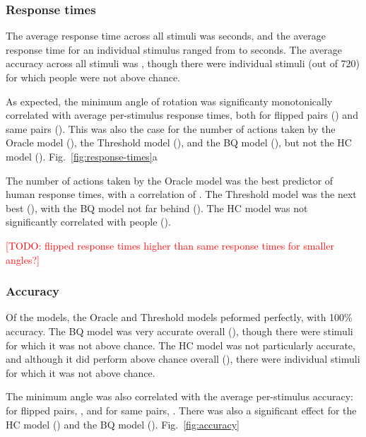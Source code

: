 \documentclass[10pt,letterpaper]{article}
\newcommand{\TODO}[1]{\textcolor{red}{[TODO: #1]}}
\newcommand{\Oc}[0]{Oracle}
\newcommand{\Th}[0]{Threshold}
\newcommand{\Hc}[0]{HC}
\newcommand{\Bq}[0]{BQ}
\begin{document}
\subsubsection{Response times}

The average response time across all stimuli was \ExpTime{} seconds,
and the average response time for an individual stimulus ranged from
\ExpTimeMin{} to \ExpTimeMax{} seconds. The average accuracy across
all stimuli was \ExpAccuracy{}, though there were \ExpNumChance{}
individual stimuli (out of 720) for which people were not above
chance.

As expected, the minimum angle of rotation was significanty
monotonically correlated with average per-stimulus response times,
both for flipped pairs (\ExpThetaTimeCorrFlipped{}) and same pairs
(\ExpThetaTimeCorrSame{}). This was also the case for the number of
actions taken by the \Oc{} model (\OcThetaTimeCorr{}), the \Th{}
model (\ThThetaTimeCorr{}), and the \Bq{} model
(\BqThetaTimeCorr{}), but not the \Hc{} model
(\HcThetaTimeCorr{}). Fig.~\ref{fig:response-times}a

The number of actions taken by the \Oc{} model was the best predictor
of human response times, with a correlation of \ExpOcTimeCorr{}. The
\Th{} model was the next best (\ExpThTimeCorr{}), with the \Bq{} model
not far behind (\ExpBqTimeCorr{}). The \Hc{} model was not
significantly correlated with people (\ExpHcTimeCorr{}).

\TODO{flipped response times higher than same response times for
  smaller angles?}

\subsubsection{Accuracy}

Of the models, the \Oc{} and \Th{} models peformed perfectly,
with 100\% accuracy. The \Bq{} model was very accurate
overall (\BqAccuracy{}), though there were \BqNumChance{} stimuli for
which it was not above chance. The \Hc{} model was not
particularly accurate, and although it did perform above chance
overall (\HcAccuracy{}), there were \HcNumChance{} individual stimuli
for which it was not above chance.

The minimum angle was also correlated with the average per-stimulus
accuracy: for flipped pairs, \ExpThetaAccuracyCorrFlipped{}, and for
same pairs, \ExpThetaAccuracyCorrSame{}. There was also a significant
effect for the \Hc{} model (\HcThetaAccuracyCorr{}) and the
\Bq{} model
(\BqThetaAccuracyCorr{}). Fig.~\ref{fig:accuracy}
\end{document}
